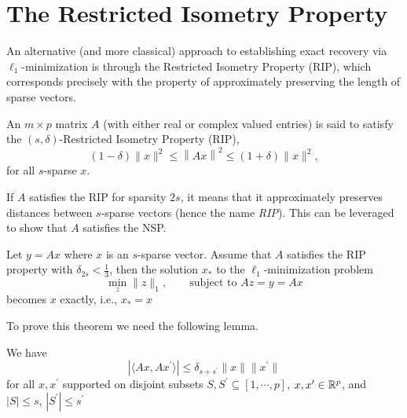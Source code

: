 \section{The Restricted Isometry Property}
\label{s:rip}

An alternative (and more classical) approach to establishing exact recovery via $\ell_1$-minimization is through the Restricted Isometry Property (RIP), which corresponds precisely with the property of approximately preserving the length of sparse vectors.

\begin{definition}\label{def:6:RIP_2}
An $m\times p$ matrix $A$ (with either real or complex valued entries) is said to satisfy the $(s,\delta)$-Restricted Isometry Property (RIP),
\[
 (1-\delta)\|x\|^2 \leq \left\| Ax\right\|^2 \leq (1+\delta)\|x\|^2,
\]
for all $s$-sparse $x$.
\end{definition}


If $A$ satisfies the RIP  for sparsity $2s$, it means that it approximately preserves distances between $s$-sparse vectors (hence the name {\em RIP}). This can be leveraged to show that $A$ satisfies the NSP. 


\begin{theorem}
Let $y=Ax$ where $x$ is an $s$-sparse vector. Assume that $A$ satisfies the RIP property
with $\delta_{2s} < \frac{1}{3}$, then the solution $x_*$ to the $\ell_1$-minimization problem
\begin{equation}\label{l1min}
\min_z \|z\|_1, \qquad \text{subject to } Az = y = Ax
\end{equation}
becomes $x$ exactly, i.e., $x_* = x$
\label{thm:maincs}
\end{theorem}

To prove this theorem we need the following lemma.

\begin{lemma}\label{lemma:np}
We have
\[
| \langle Ax, Ax^\prime \rangle | \leq \delta_{s+s^{\prime}} \|x\| \|x^\prime\|
\]
for all $x, x^\prime$ supported 
on disjoint subsets $S, S^\prime \subseteq [1, \cdots, p]$, $x, x^\prime \in \mathbb{R}^p$,
and $|S| \leq s$, $|S^\prime| \leq s^\prime$
\end{lemma}

